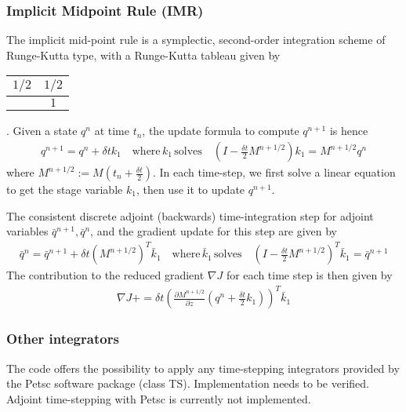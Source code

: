 \documentclass[11pt]{article}
\begin{document}
    \subsubsection{Implicit Midpoint Rule (IMR)} 
    The implicit mid-point rule is a symplectic, second-order integration scheme
    of Runge-Kutta type, with a Runge-Kutta tableau given by
    \begin{tabular}{ c | c }
      $1/2$ & $ 1/2$ \\
      \hline
                &  $1$
    \end{tabular}.
    Given a state $q^n$ at time $t_n$, the update formula to compute $q^{n+1}$
    is hence 
    \begin{align}
      q^{n+1} = q^n + \delta t k_1 \quad \text{where} \, k_1 \, \text{solves}
      \quad \left( I-\frac{\delta t}{2} M^{n+1/2} \right) k_1 = M^{n+1/2}  q^n
    \end{align}
    where $M^{n+1/2} := M(t_n + \frac{\delta t}{2})$. In each time-step, we
    first solve a linear equation to get the stage variable $k_1$, then use it
    to update $q^{n+1}$. 

    The consistent discrete adjoint (backwards) time-integration step for
    adjoint variables $\bar q^{n+1}, \bar q^n$, and the gradient update for this
    step are given by
    \begin{align}
      \bar q^{n} = \bar q^{n+1} + \delta t \left(M^{n+1/2}\right)^T \bar k_1
      \quad \text{where} \, \bar k_1 \, \text{solves} \quad \left(
      I-\frac{\delta t}{2} M^{n+1/2}\right)^T  \bar k_1 = \bar q^{n+1} 
    \end{align}
    The contribution to the reduced gradient $\nabla J$ for each time step is
    then given by
    \begin{align}
      \nabla J += \delta t \left( \frac{\partial M^{n+1/2}}{\partial z}
      \left(q^n + \frac{\delta t}{2} k_1\right) \right)^T\bar k_1
    \end{align}


    \subsubsection{Other integrators}
    The code offers the possibility to apply any time-stepping integrators
    provided by the Petsc software package (class TS). Implementation needs to
    be verified. Adjoint time-stepping with Petsc is currently not
    implemented. 
\end{document}
